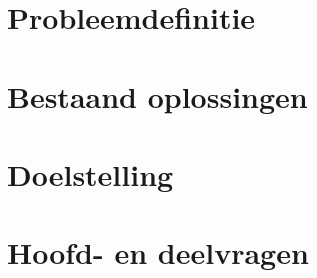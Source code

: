 \styledchapter[Probleemanalyse]

\section{Probleemdefinitie}

\section{Bestaand oplossingen}

\section{Doelstelling}

\section{Hoofd- en deelvragen}